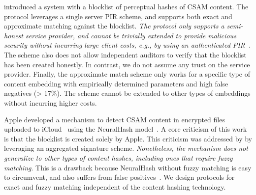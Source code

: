 



 
%
\citet{kulshrestha2021identifying} introduced a system with a
blocklist of perceptual hashes of CSAM content. The protocol leverages a 
single server PIR scheme, and supports both exact and approximate matching 
against the blocklist. \emph{The protocol only
supports a semi-honest service provider, and cannot be trivially
extended to provide malicious security without incurring large client costs,
e.g., by using an authenticated PIR~\cite{colombo2023authpir}}. The
scheme also does not allow independent auditors to verify that the
blocklist has been created honestly. In contrast, we do 
not assume any trust on the service provider. Finally, the approximate match scheme 
only works for a specific type of content embedding with empirically determined parameters and high false negatives (> 17\%). 
The scheme cannot be extended to other types of embeddings without incurring higher costs. 





%
Apple developed a mechanism to detect CSAM content in encrypted files
uploaded to iCloud~\cite{apple2021csam} using the NeuralHash model~\cite{bhowmick2021apple}. 
A core criticism of this work is that the blocklist is created solely by
Apple. This criticism was addressed by \citet{scheffler2023public} by
leveraging an aggregated signature scheme. \emph{Nonetheless, the mechanism does not generalize to other types of content hashes, including ones that require fuzzy matching}. This is a drawback because NeuralHash without fuzzy matching is easy to circumvent, and also suffers from false positives~\cite{struppek2022learning, neuralHashAttack}. We design protocols for exact and fuzzy matching independent of the content hashing technology. 

